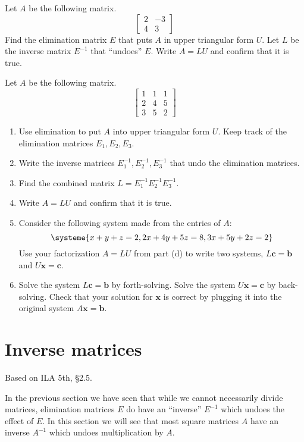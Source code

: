 \documentclass[11pt,oneside]{amsbook}
\theoremstyle{definition}
\theoremstyle{plain}
\theoremstyle{definition}
\theoremstyle{remark}
\numberwithin{equation}{section}
\numberwithin{figure}{section}
\newcounter{activityitem}
\newenvironment{activity}{\begin{list}{\arabic{activityitem}.}{\usecounter{activityitem}\setlength{\itemsep}{.2in}}}{\end{list}}
\begin{document}
\begin{activity}
  \item Let $A$ be the following matrix.
  \[\begin{bmatrix}2&-3\\4&3\end{bmatrix}
  \]
  Find the elimination matrix $E$ that puts $A$ in upper triangular form $U$. Let $L$ be the inverse matrix $E^{-1}$ that ``undoes'' $E$. Write $A=LU$ and confirm that it is true.
  \item Let $A$ be the following matrix.
  \[\begin{bmatrix}1&1&1\\2&4&5\\3&5&2\end{bmatrix}
  \]
  \begin{enumerate}
    \item Use elimination to put $A$ into upper triangular form $U$. Keep track of the elimination matrices $E_1,E_2,E_3$.
    \item Write the inverse matrices $E_1^{-1},E_2^{-1},E_3^{-1}$ that undo the elimination matrices.
    \item Find the combined matrix $L=E_1^{-1}E_2^{-1}E_3^{-1}$.
    \item Write $A=LU$ and confirm that it is true.
    \item Consider the following system made from the entries of $A$:
    \[\systeme{x+y+z=2,2x+4y+5z=8,3x+5y+2z=2}
    \]
    Use your factorization $A=LU$ from part (d) to write two systems, $L\mathbf{c}=\mathbf{b}$ and $U\mathbf{x}=\mathbf{c}$.
    \item Solve the system $L\mathbf{c}=\mathbf{b}$ by forth-solving. Solve the system $U\mathbf{x}=\mathbf{c}$ by back-solving. Check that your solution for $\mathbf{x}$ is correct by plugging it into the original system $A\mathbf{x}=\mathbf{b}$.
  \end{enumerate}
\end{activity}

\newpage
\section{Inverse matrices}

Based on ILA 5th, \S 2.5.

In the previous section we have seen that while we cannot necessarily divide matrices, elimination matrices $E$ do have an ``inverse'' $E^{-1}$ which undoes the effect of $E$. In this section we will see that most square matrices $A$ have an inverse $A^{-1}$ which undoes multiplication by $A$.
\end{document}
